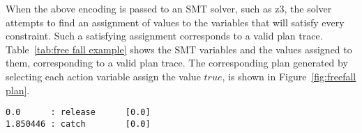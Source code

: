 When the above encoding is passed to an SMT solver, such as {\sc z3}, the solver attempts to find an assignment of values to the variables that will satisfy every constraint. Such a satisfying assignment corresponds to a valid plan trace. Table~\ref{tab:free fall example} shows the SMT variables and the values assigned to them, corresponding to a valid plan trace. The corresponding plan generated by selecting each action variable assign the value $true$, is shown in Figure~\ref{fig:freefall plan}.


\begin{figure*}[htb!]
\small
\centering
\begin{BVerbatim}
0.0      : release      [0.0]
1.850446 : catch        [0.0]
\end{BVerbatim}
\caption{Plan for the Free Fall problem.}
\label{fig:freefall plan}
\end{figure*}

